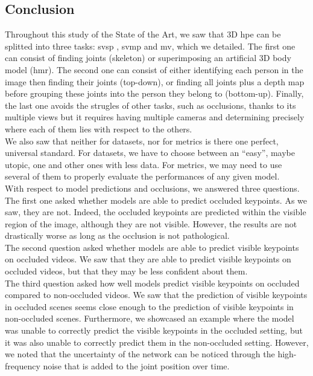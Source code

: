 \documentclass[runningheads]{llncs}
\begin{document}
\subsection{Conclusion}
Throughout this study of the State of the Art, we saw that 3D \ac{hpe} can be splitted into three tasks: \ac{svsp} , \ac{svmp} and \ac{mv}, which we detailed. The first one can consist of finding joints (skeleton) or superimposing an artificial 3D body model (\ac{hmr}). The second one can consist of either identifying each person in the image then finding their joints (top-down), or finding all joints plus a depth map before grouping these joints into the person they belong to (bottom-up). Finally, the last one avoids the strugles of other tasks, such as occlusions, thanks to its multiple views but it requires having multiple cameras and determining precisely where each of them lies with respect to the others. \\
We also saw that neither for datasets, nor for metrics is there one perfect, universal standard. For datasets, we have to choose between an ``easy'', maybe utopic, one and other ones with less data. For metrics, we may need to use several of them to properly evaluate the performances of any given model. \\
With respect to model predictions and occlusions, we answered three questions. The first one asked whether models are able to predict occluded keypoints. As we saw, they are not. Indeed, the occluded keypoints are predicted within the visible region of the image, although they are not visible. However, the results are not drastically worse as long as the occlusion is not pathological. \\
The second question asked whether models are able to predict visible keypoints on occluded videos. We saw that they are able to predict visible keypoints on occluded videos, but that they may be less confident about them. \\
The third question asked how well models predict visible keypoints on occluded compared to non-occluded videos. We saw that the prediction of visible keypoints in occluded scenes seems close enough to the prediction of visible keypoints in non-occluded scenes. Furthermore, we showcased an example where the model was unable to correctly predict the visible keypoints in the occluded setting, but it was also unable to correctly predict them in the non-occluded setting. However, we noted that the uncertainty of the network can be noticed through the high-frequency noise that is added to the joint position over time.
\end{document}
